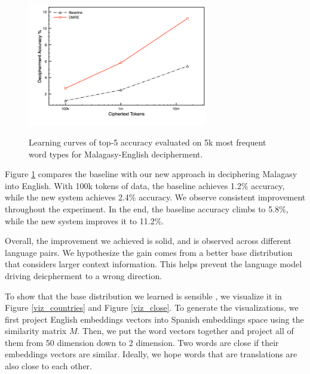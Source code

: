  \begin{figure}[!ht]
  \centering
  \includegraphics[width=3.1in,height=2.4in]{mlg_en_curve}
  \caption{Learning curves of top-5 accuracy evaluated on 5k most frequent word types for Malagasy-English decipherment.}
\label{mlg-en-curve}
\end{figure}

Figure \ref{mlg-en-curve} compares the baseline with our new approach in deciphering Malagasy into English. With 100k tokens of data, the baseline achieves 1.2\% accuracy, while the new system achieves 2.4\% accuracy.  We observe consistent improvement throughout the experiment. In the end, the baseline accuracy climbs to 5.8\%, while the new system improves it to 11.2\%.

Overall, the improvement we achieved is solid, and is observed across different language pairs. We hypothesize the gain comes from a better base distribution that considers larger context information. This helps prevent the language model driving deicpherment to a wrong direction. 

To show that the base distribution we learned is sensible , we visualize it in Figure \ref{viz_countries} and Figure \ref{viz_close}. To generate the visualizations, we first project English embeddings vectors into Spanish embeddings space using the similarity matrix $M$. Then, we put the word vectors together and project all of them from 50 dimension down to 2 dimension. Two words are close if their embeddings vectors are similar. Ideally, we hope words that are translations are also close to each other.

